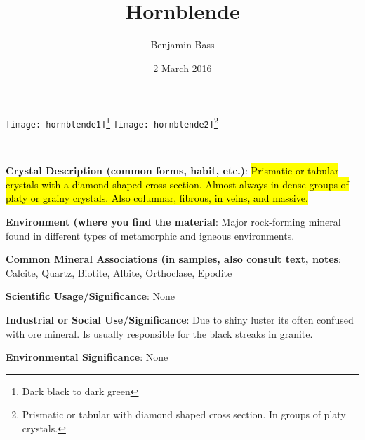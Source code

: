 \documentclass[10pt]{article}
\author{Benjamin Bass}
\date{2 March 2016}
\title{\vspace{-2.0cm}Hornblende} %
\begin{document}
\maketitle


\begin{center}
  \texttt{[image: hornblende1]}\footnote{Dark black to dark green}
  \texttt{[image: hornblende2]}\footnote{Prismatic or tabular with diamond shaped cross section. In groups of platy crystals.}
\end{center}



\
\
\
\
\
\
\
\
\
\

\begin{framed}
  \textbf{Crystal Description (common forms, habit, etc.)}: \hl{Prismatic or tabular crystals with a diamond-shaped cross-section. Almost always in dense groups of platy or grainy crystals. Also columnar, fibrous, in veins, and massive.}
\end{framed}

\begin{framed}
  \textbf{Environment (where you find the material}: Major rock-forming mineral found in different types of metamorphic and igneous environments.
\end{framed}

\begin{framed}
  \textbf{Common Mineral Associations (in samples, also consult text, notes}: Calcite, Quartz, Biotite, Albite, Orthoclase, Epodite
\end{framed}

\begin{framed}
  \textbf{Scientific Usage/Significance}: None
\end{framed}

\begin{framed}
  \textbf{Industrial or Social Use/Significance}: Due to shiny luster its often confused with ore mineral. Is usually responsible for the black streaks in granite.
\end{framed}

\begin{framed}
  \textbf{Environmental Significance}: None
\end{framed}

\end{document}
